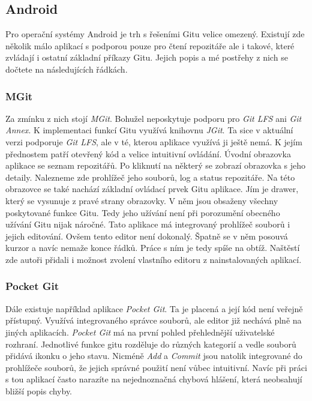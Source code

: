     \subsection {Android}
    Pro operační systémy Android je trh s řešeními Gitu velice omezený. Existují zde několik málo aplikací s podporou pouze pro čtení repozitáře ale i takové, které zvládají i ostatní základní příkazy Gitu. Jejich popis a mé postřehy z nich se dočtete na následujících řádkách.
    \subsubsection{MGit}
    Za zmínku z nich stojí \emph{MGit}. Bohužel neposkytuje podporu pro \emph{Git LFS} ani \emph{Git Annex}. K implementaci funkcí Gitu využívá knihovnu \emph{JGit}. Ta sice v aktuální verzi podporuje \emph{Git LFS}, ale v té, kterou aplikace využívá ji ještě nemá. K jejím přednostem patří otevřený kód a velice intuitivní ovládání.
    Úvodní obrazovka aplikace se seznam repozitářů. Po kliknutí na některý se zobrazí obrazovka s jeho detaily. Nalezneme zde prohlížeč jeho souborů, log a status repozitáře. Na této obrazovce se také nachází základní ovládací prvek Gitu aplikace. Jím je drawer, který se vysunuje z pravé strany obrazovky. V něm jsou obsaženy všechny poskytované funkce Gitu. Tedy jeho užívání není při porozumění obecného užívání Gitu nijak náročné. Tato aplikace má integrovaný prohlížeč souborů i jejich editování. Ovšem tento editor není dokonalý. Špatně se v něm posouvá kurzor a navíc nemaže konce řádků. Práce s ním je tedy spíše na obtíž. Naštěstí zde autoři přidali i možnost zvolení vlastního editoru z nainstalovaných aplikací.

    \subsubsection{Pocket Git}
    Dále existuje například aplikace \emph{Pocket Git}. Ta je placená a její kód není veřejně přístupný. Využívá integrovaného správce souborů, ale editor již nechává plně na jiných aplikacích. \emph{Pocket Git} má na první pohled přehlednější uživatelské rozhraní. Jednotlivé funkce gitu rozděluje do různých kategorií a vedle souborů přidává ikonku o jeho stavu. Nicméně \emph{Add} a \emph{Commit} jsou natolik integrované do prohlížeče souborů, že jejich správné použití není vůbec intuitivní. Navíc při práci s tou aplikací často narazíte na nejednoznačná chybová hlášení, která neobsahují bližší popis chyby.


